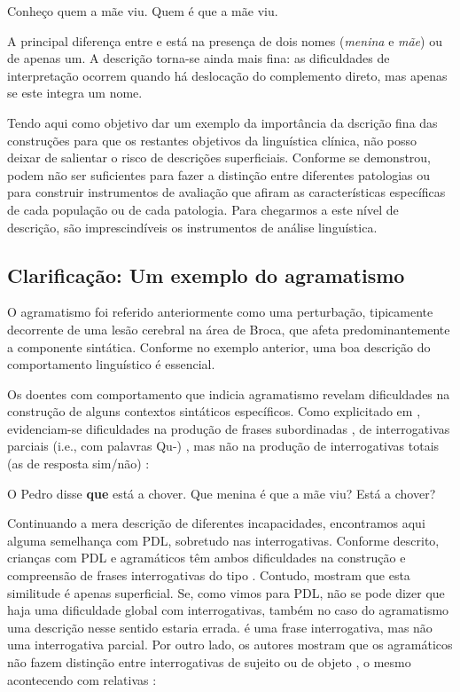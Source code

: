 \documentclass[output=paper,colorlinks,citecolor=brown,booklanguage=portuguese]{langscibook}
\begin{document}
\ea\label{ex:cap2ex19}
    \ea\label{ex:cap2ex19a} Conheço quem a mãe viu.
    \ex\label{ex:cap2ex19b} Quem é que a mãe viu.
    \z
\z

A principal diferença entre  e  está na presença de dois nomes (\emph{menina} e \emph{mãe}) ou de apenas um. A descrição torna-se ainda mais fina: as dificuldades de interpretação ocorrem quando há deslocação do complemento direto, mas apenas se este integra um nome.

Tendo aqui como objetivo dar um exemplo da importância da dscrição fina das construções para que os restantes objetivos da linguística clínica, não posso deixar de salientar o risco de descrições superficiais. Conforme se demonstrou, podem não ser suficientes para fazer a distinção entre diferentes patologias ou para construir instrumentos de avaliação que afiram as características específicas de cada população ou de cada patologia. Para chegarmos a este nível de descrição, são imprescindíveis os instrumentos de análise linguística.


\subsection{Clarificação: Um exemplo do agramatismo}
O agramatismo foi referido anteriormente como uma perturbação, tipicamente decorrente de uma lesão cerebral na área de Broca, que afeta predominantemente a componente sintática. Conforme no exemplo anterior, uma boa descrição do comportamento linguístico é essencial. 

Os doentes com comportamento que indicia agramatismo revelam dificuldades na construção de alguns contextos sintáticos específicos. Como explicitado em \citet{Friedmann1994}, evidenciam-se dificuldades na produção de frases subordinadas , de interrogativas parciais (i.e., com palavras Qu-) , mas não na produção de interrogativas totais (as de resposta sim/não) :

\ea
        \ea\label{ex:cap2ex20a} O Pedro disse \textbf{que} está a chover.
        \ex\label{ex:cap2ex20b} Que menina é que a mãe viu?
        \ex\label{ex:cap2ex20c} Está a chover?
    \z
\z

Continuando a mera descrição de diferentes incapacidades, encontramos aqui alguma semelhança com PDL, sobretudo nas interrogativas. Conforme descrito, crianças com PDL e agramáticos têm ambos dificuldades na construção e compreensão de frases interrogativas do tipo . Contudo, \citeauthor{Friedmann1994} mostram que esta similitude é apenas superficial. Se, como vimos para PDL, não se pode dizer que haja uma dificuldade global com interrogativas, também no caso do agramatismo uma descrição nesse sentido estaria errada.  é uma frase interrogativa, mas não uma interrogativa parcial. Por outro lado, os autores mostram que os agramáticos não fazem distinção entre interrogativas de sujeito  ou de objeto , o mesmo acontecendo com relativas :
\end{document}
